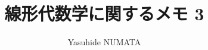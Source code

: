 \documentclass[tombow,dvipdfmx]{jsbook}
\theoremstyle{plain}
\theoremstyle{japanese}
\theoremstyle{remark}
\theoremstyle{japanese}
\theoremstyle{definition}
\theoremstyle{japanese}
\theoremstyle{definition}
\theoremstyle{numberedproof}
\theoremstyle{japanesenumberedproof}
\begin{document}
\title{線形代数学に関するメモ 3}

\author{Yasuhide NUMATA}

\maketitle




%

%


\appendix


%

{\printindex}
\end{document}
